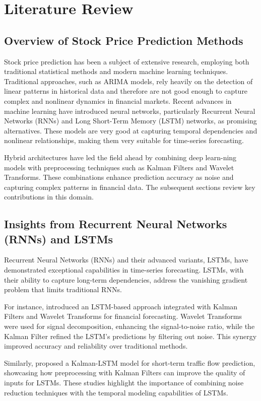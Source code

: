 \chapter{Literature Review}

\section{Overview of Stock Price Prediction Methods}
Stock price prediction has been a subject of extensive research, employing both traditional statistical methods and modern machine learning techniques. Traditional approaches, such as ARIMA models, rely heavily on the detection of linear patterns in historical data and therefore are not good enough to capture complex and nonlinear dynamics in financial markets. Recent advances in machine learning have introduced neural networks, particularly Recurrent Neural Networks (RNNs) and Long Short-Term Memory (LSTM) networks, as promising alternatives. These models are very good at capturing temporal dependencies and nonlinear relationships, making them very suitable for time-series forecasting.

Hybrid architectures have led the field ahead by combining deep learn-ning models with preprocessing techniques such as Kalman Filters and Wavelet Transforms. These combinations enhance prediction accuracy as noise and
capturing complex patterns in financial data. The subsequent sections review key contributions in this domain.

\section{Insights from Recurrent Neural Networks (RNNs) and LSTMs}
Recurrent Neural Networks (RNNs) and their advanced variants, LSTMs, have demonstrated exceptional capabilities in time-series forecasting. LSTMs, with their ability to capture long-term dependencies, address the vanishing gradient problem that limits traditional RNNs.  

For instance, \textcite{dastgerdi_investigating_2022} introduced an LSTM-based approach integrated with Kalman Filters and Wavelet Transforms for financial forecasting. Wavelet Transforms were used for signal decomposition, enhancing the signal-to-noise ratio, while the Kalman Filter refined the LSTM’s predictions by filtering out noise. This synergy improved accuracy and reliability over traditional methods.  

Similarly, \textcite{fang_kalman-lstm_2021} proposed a Kalman-LSTM model for short-term traffic flow prediction, showcasing how preprocessing with Kalman Filters can improve the quality of inputs for LSTMs. These studies highlight the importance of combining noise reduction techniques with the temporal modeling capabilities of LSTMs.

